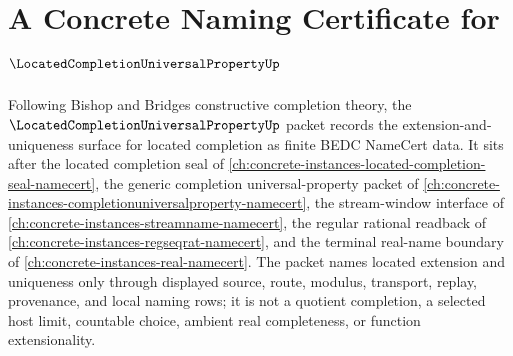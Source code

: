 \chapter{A Concrete Naming Certificate for $\LocatedCompletionUniversalPropertyUp$}
\label{ch:concrete-instances-located-completion-universal-property-namecert}

Following Bishop and Bridges constructive completion theory, the $\LocatedCompletionUniversalPropertyUp$ packet records the extension-and-uniqueness surface for located completion as finite BEDC NameCert data. It sits after the located completion seal of \autoref{ch:concrete-instances-located-completion-seal-namecert}, the generic completion universal-property packet of \autoref{ch:concrete-instances-completionuniversalproperty-namecert}, the stream-window interface of \autoref{ch:concrete-instances-streamname-namecert}, the regular rational readback of \autoref{ch:concrete-instances-regseqrat-namecert}, and the terminal real-name boundary of \autoref{ch:concrete-instances-real-namecert}. The packet names located extension and uniqueness only through displayed source, route, modulus, transport, replay, provenance, and local naming rows; it is not a quotient completion, a selected host limit, countable choice, ambient real completeness, or function extensionality.

